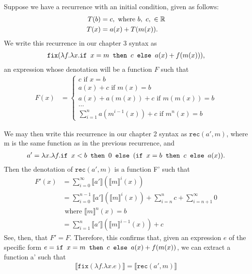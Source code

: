 Suppose we have a recurrence with an initial condition, given as follows:
\begin{align*}
T(b) &= c, \text{ where } b, \ c, \ \in \mathbb{R} \\
T(x) &= a(x) + T(m(x)).
\end{align*}
We write this recurrence in our chapter 3 syntax as 
\begin{align*}
\texttt{fix}(\lambda f.\lambda x. \texttt{if } x = m \texttt{ then } c \texttt{ else } a(x) + f(m(x))),
\end{align*}
an expression whose denotation will be a function $F$ such that
\begin{align*}
F(x) &=
\begin{cases}
c \text{ if } x = b \\
a(x) + c \text{ if } m(x) = b \\
a(x) + a(m(x)) + c \text{ if } m(m(x)) = b \\
\ldots \\
\sum_{i=1}^{n} a(m^{i-1}(x)) + c \text{ if } m^n(x) = b
\end{cases}
\end{align*}

We may then write this recurrence in our chapter 2 syntax as $\texttt{rec}(a',m)$, where m is the same function
as in the previous recurrence, and
\begin{align*}
a' = \lambda x.\lambda f. \texttt{if } x < b \texttt{ then } 0 \texttt{ else } (\texttt{if } x = b \texttt{ then } c \texttt{ else } a(x)).
\end{align*}
Then the denotation of $\texttt{rec}(a',m)$ is a function F' such that 
\begin{align*}
F'(x) &= \sum_{i=0}^{\infty} \llbracket a' \rrbracket(\llbracket m \rrbracket^i(x)) \\
&= \sum_{i=0}^{n-1} \llbracket a' \rrbracket( \llbracket m \rrbracket^i(x)) + \sum_{i=n}^n c + \sum_{i = n+1}^{\infty} 0 \\
&\text{ where } \llbracket m \rrbracket^n(x) = b \\
&= \sum_{i=1}^{n}\llbracket a' \rrbracket ( \llbracket m \rrbracket^{i-1}(x)) + c
\end{align*}
See, then, that $F' = F$. Therefore, this confirms that, given an expression $e$ of the specific form
$e = \texttt{if } x = m \texttt{ then } c \texttt{ else } a(x) + f(m(x))$, we can extract a function a' such that 
\begin{align*}
\llbracket \texttt{fix}(\lambda f. \lambda x.e) \rrbracket = \llbracket \texttt{rec}(a',m)\rrbracket
\end{align*}





 